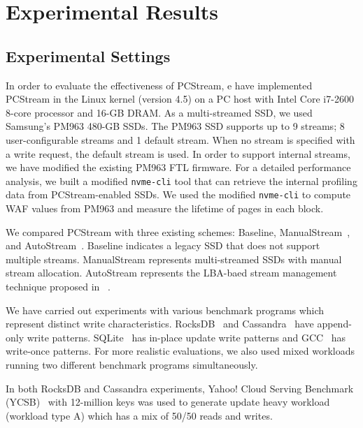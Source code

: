 \vspace{-10pt}
\section{Experimental Results}
\vspace{-5pt}
\subsection{Experimental Settings}
\vspace{-5pt}
In order to evaluate the effectiveness of \textsf{\small PCStream},
e have implemented  \textsf{\small PCStream} in the Linux kernel (version 4.5) 
on a PC host with Intel Core i7-2600 8-core processor and 16-GB DRAM.  
As a multi-streamed SSD, we used Samsung's PM963 480-GB SSDs.
The PM963 SSD supports up to 9 streams; 8
user-configurable streams and 1 default stream. 
When no stream is specified with a write request, the default stream is used.
In order to support internal streams, we have modified the existing PM963 FTL firmware.  
For a detailed performance analysis, we built a modified {\tt nvme-cli} tool that can 
retrieve the internal profiling data from PCStream-enabled SSDs.  
We used the modified {\tt nvme-cli} to compute WAF values from PM963 and 
measure the lifetime of pages in each block. 

We compared \textsf{\small PCStream} with three
existing schemes: \textsf{\small Baseline}, \textsf{\small
ManualStream}~\cite{MultiStream}, and \textsf{\small
AutoStream}~\cite{AutoStream}.  \textsf{\small Baseline} indicates a legacy
SSD that does not support multiple streams. \textsf{\small ManualStream}
represents multi-streamed SSDs with manual stream allocation.  \textsf{\small
AutoStream} represents the LBA-baed stream management technique proposed
in ~\cite{AutoStream}. 


We have carried out experiments with various benchmark programs
which represent distinct write characteristics.
RocksDB~\cite{RocksDB} and Cassandra~\cite{Cassandra} have
append-only write patterns. SQLite~\cite{SQLite} has in-place update write patterns
and GCC~\cite{GCC} has write-once patterns.  
For more realistic evaluations, we also used mixed workloads running two 
different benchmark programs simultaneously.

In both RocksDB and Cassandra experiments, Yahoo! Cloud
Serving Benchmark (YCSB)~\cite{YCSB} with 12-million keys was used to
generate update heavy workload (workload type A) which has a mix of 50/50 reads and writes.

